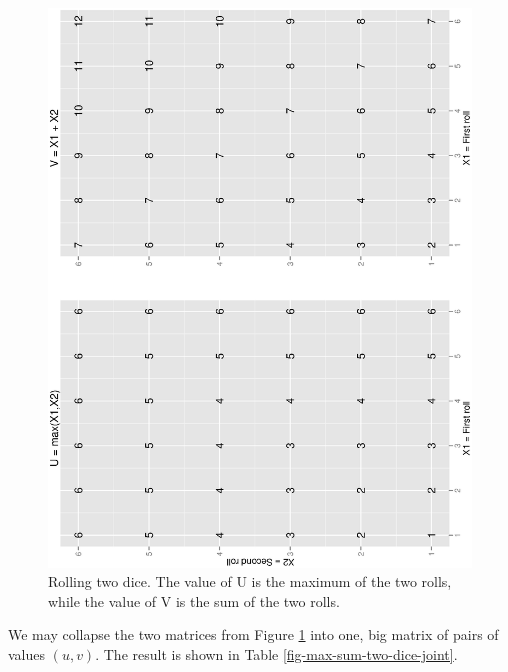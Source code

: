 \documentclass[captions=tableheading]{scrbook}
\begin{document}
\begin{example}
\begin{figure}[th]
  \includegraphics[angle=270, totalheight=4in]{ps/multdist/max-and-sum-two-dice.ps}
  \caption[Max and Sum of two dice]{\small Rolling two dice. The value of U is the maximum of the two rolls, while the value of V is the sum of the two rolls.}
  \label{fig-max-and-sum-two-dice}
\end{figure}


We may collapse the two matrices from Figure \ref{fig-max-and-sum-two-dice} into one, big matrix of pairs of values \((u,v)\). The result is shown in Table \ref{fig-max-sum-two-dice-joint}. 









\end{example}
\end{document}
